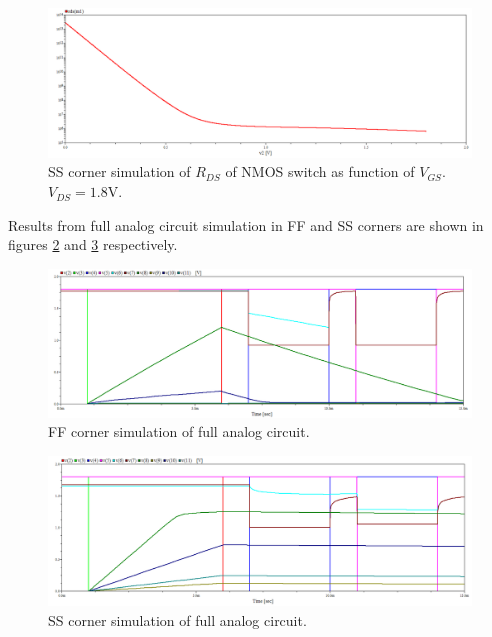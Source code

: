 \begin{figure}
    \centering
    \includegraphics[width=\textwidth]{graphs/corner_ss_simulation.png}
    \caption{SS corner simulation of $R_{DS}$ of NMOS switch as function of $V_{GS}$. $V_{DS} = 1.8\mathrm{V}$.}
    \label{fig:ss}
\end{figure}

Results from full analog circuit simulation in FF and SS corners are shown in figures \ref{fig:ffFull} and \ref{fig:ssFull} respectively.

\begin{figure}
    \centering
    \includegraphics[width=\textwidth]{graphs/analogWaveform_ff.png}
    \caption{FF corner simulation of full analog circuit.}
    \label{fig:ffFull}
\end{figure}

\begin{figure}
    \centering
    \includegraphics[width=\textwidth]{graphs/analogWaveform_ss.png}
    \caption{SS corner simulation of full analog circuit.}
    \label{fig:ssFull}
\end{figure}

